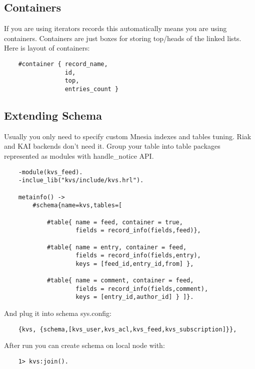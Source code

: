 \subsection{Containers}

If you are using iterators records this automatically
means you are using containers. Containers are just boxes
for storing top/heads of the linked lists. Here is layout
of containers:

\begin{lstlisting}
    #container { record_name,
                 id,
                 top,
                 entries_count }
\end{lstlisting}

\subsection{Extending Schema}

Usually you only need to specify custom Mnesia indexes and tables tuning.
Riak and KAI backends don't need it. Group your table into table packages
represented as modules with handle\_notice API.

\begin{lstlisting}
    -module(kvs_feed).
    -inclue_lib("kvs/include/kvs.hrl").

    metainfo() ->
        #schema{name=kvs,tables=[

            #table{ name = feed, container = true,
                    fields = record_info(fields,feed)},

            #table{ name = entry, container = feed,
                    fields = record_info(fields,entry),
                    keys = [feed_id,entry_id,from] },

            #table{ name = comment, container = feed,
                    fields = record_info(fields,comment),
                    keys = [entry_id,author_id] } ]}.
\end{lstlisting}

And plug it into schema sys.config:

\begin{lstlisting}
    {kvs, {schema,[kvs_user,kvs_acl,kvs_feed,kvs_subscription]}},
\end{lstlisting}

After run you can create schema on local node with:

\begin{lstlisting}
    1> kvs:join().
\end{lstlisting}

